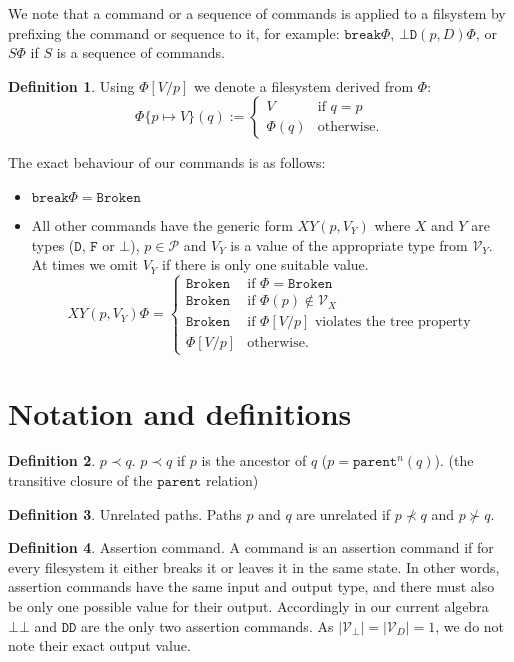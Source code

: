 \documentclass[12pt]{article}
\newcommand{\setvx}[1]{\mathcal{V}_{#1}}
\newcommand{\setd}{\setvx{D}}
\newcommand{\setb}{\setvx{\empt}}
\newcommand{\setp}{\mathcal{P}}
\newcommand{\empt}{\bot}
\newcommand{\parent}{\mathtt{parent}}
\newcommand{\fsbroken}{\mathtt{Broken}} %
\newcommand{\FS}{\Phi} %
\newcommand{\cbrk}{\mathtt{break}}
\newcommand{\fscommand}[2]{{#1#2}}
\newcommand{\fsregcommandchar}[1]{\mathtt{#1}}
\newcommand{\fsregcommand}[2]{\fscommand{\fsregcommandchar{#1}}{\fsregcommandchar{#2}}}
\newcommand{\cbb}{\fsregcommand{\empt}{\empt}}
\newcommand{\cbd}{\fsregcommand{\empt}{D}}
\newcommand{\cdd}{\fsregcommand{D}{D}}
\newcommand{\cxy}{\fscommand{X}{Y}}
\newcommand{\descendant}{\prec}
\newcommand{\ancestor}{\succ}
\theoremstyle{definition}
\newtheorem{mydef}{Definition}
\begin{document}
We note that a command or a sequence of commands is applied to a filsystem
by prefixing the command or sequence to it, for example: $\cbrk\FS$, $\cbd(p,D)\FS$, 
or $S\FS$ if $S$ is a sequence of commands.

\begin{mydef}
Using $\FS[V/p]$ we denote a filesystem derived from $\FS$:
\[ \FS\{p\mapsto V\}(q) :=
   \begin{cases}
   V &\mbox{if~} q=p\\
   \FS(q) &\mbox{otherwise.}
   \end{cases}
\]
\end{mydef}

The exact behaviour of our commands is as follows:
\begin{itemize}
\item $\cbrk\FS = \fsbroken$
\item
All other commands have the generic form $\cxy(p,V_Y)$ where
$X$ and $Y$ are types ($\fsregcommandchar{D}$, $\fsregcommandchar{F}$ or $\fsregcommandchar{\empt}$),
$p\in\setp$ and $V_Y$ is a value of the appropriate type from $\setvx{Y}$.
At times we omit $V_Y$ if there is only one suitable value.
\[ \cxy(p,V_Y)\FS = 
   \begin{cases}
   \fsbroken &\mbox{if~} \FS=\fsbroken\\
   \fsbroken &\mbox{if~} \FS(p)\not\in\setvx{X}\\
   \fsbroken &\mbox{if~} \FS[V/p] \mbox{~violates the tree property}\\
   \FS[V/p] &\mbox{otherwise.}
   \end{cases}
\]
\end{itemize}

\section{Notation and definitions}

\begin{mydef}{$p\descendant q$.}
$p\descendant q$ if $p$ is the ancestor of $q$ ($p=\parent^n(q)$). (the transitive closure of the $\parent$ relation)
\end{mydef}

\begin{mydef}{Unrelated paths.}
Paths $p$ and $q$ are unrelated if $p\not\descendant q$ and $p\not\ancestor q$.
\end{mydef}

\begin{mydef}{Assertion command.}
A command is an assertion command if
for every filesystem it either breaks it or leaves it in the same state.
In other words, assertion commands have the same input and output type,
and there must also be only one possible value for their output.
Accordingly in our current algebra $\cbb$ and $\cdd$ are the only two assertion commands.
As $|\setb|=|\setd|=1$, we do not note their exact output value.
\end{mydef}
\end{document}
